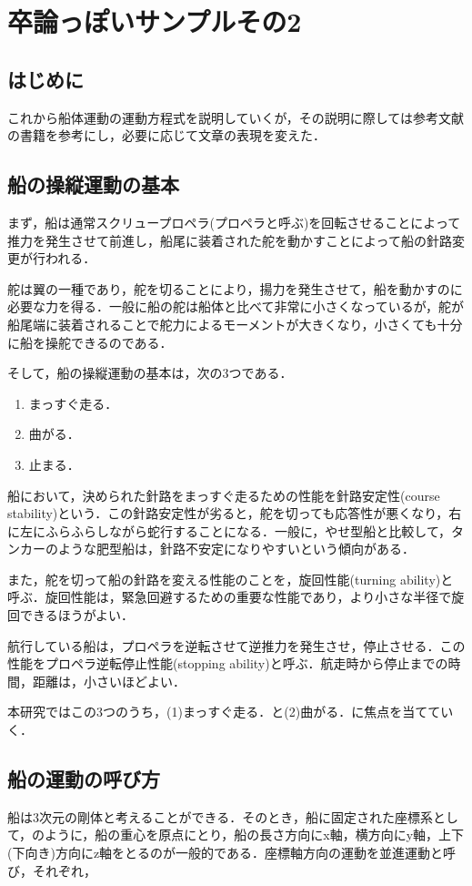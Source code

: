 \chapter{卒論っぽいサンプルその2}

\section{はじめに}
これから船体運動の運動方程式を説明していくが，その説明に際しては参考文献の書籍を参考にし，必要に応じて文章の表現を変えた．

\section{船の操縦運動の基本}
まず，船は通常スクリュープロペラ(プロペラと呼ぶ)を回転させることによって推力を発生させて前進し，船尾に装着された舵を動かすことによって船の針路変更が行われる．

舵は翼の一種であり，舵を切ることにより，揚力を発生させて，船を動かすのに必要な力を得る．一般に船の舵は船体と比べて非常に小さくなっているが，舵が船尾端に装着されることで舵力によるモーメントが大きくなり，小さくても十分に船を操舵できるのである．

そして，船の操縦運動の基本は，次の3つである．
\begin{enumerate}
	\item まっすぐ走る．
	\item 曲がる．
	\item 止まる．
\end{enumerate}

船において，決められた針路をまっすぐ走るための性能を針路安定性(course stability)という．この針路安定性が劣ると，舵を切っても応答性が悪くなり，右に左にふらふらしながら蛇行することになる．一般に，やせ型船と比較して，タンカーのような肥型船は，針路不安定になりやすいという傾向がある．

また，舵を切って船の針路を変える性能のことを，旋回性能(turning ability)と呼ぶ．旋回性能は，緊急回避するための重要な性能であり，より小さな半径で旋回できるほうがよい．

航行している船は，プロペラを逆転させて逆推力を発生させ，停止させる．この性能をプロペラ逆転停止性能(stopping ability)と呼ぶ．航走時から停止までの時間，距離は，小さいほどよい．

本研究ではこの3つのうち，(1)まっすぐ走る．と(2)曲がる．に焦点を当てていく．

\section{船の運動の呼び方}
船は3次元の剛体と考えることができる．そのとき，船に固定された座標系として，のように，船の重心を原点にとり，船の長さ方向にx軸，横方向にy軸，上下(下向き)方向にz軸をとるのが一般的である．座標軸方向の運動を並進運動と呼び，それぞれ，

